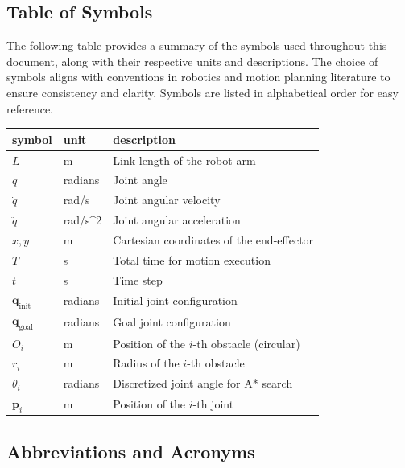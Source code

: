 \documentclass[12pt]{article}
\begin{document}
\subsection{Table of Symbols}

The following table provides a summary of the symbols used throughout this document, along with their respective units and descriptions. The choice of symbols aligns with conventions in robotics and motion planning literature to ensure consistency and clarity. Symbols are listed in alphabetical order for easy reference.

\renewcommand{\arraystretch}{1.2}
\noindent \begin{longtable*}{l l p{12cm}} \toprule
\textbf{symbol} & \textbf{unit} & \textbf{description}\\
\midrule 
\( L \) & \si{\metre} & Link length of the robot arm \\
\( q \) & radians & Joint angle \\
\( \dot{q} \) & rad/s & Joint angular velocity \\
\( \ddot{q} \) & rad/s^2 & Joint angular acceleration \\
\( x, y \) & \si{\metre} & Cartesian coordinates of the end-effector \\
\( T \) & \si{\second} & Total time for motion execution \\
\( t \) & \si{\second} & Time step \\
\( \mathbf{q}_{\text{init}} \) & radians & Initial joint configuration \\
\( \mathbf{q}_{\text{goal}} \) & radians & Goal joint configuration \\
\( O_i \) & \si{\metre} & Position of the \(i\)-th obstacle (circular) \\
\( r_i \) & \si{\metre} & Radius of the \(i\)-th obstacle \\
\( \theta_i \) & radians & Discretized joint angle for A* search \\
\( \mathbf{p}_i \) & \si{\metre} & Position of the \(i\)-th joint \\

\bottomrule
\end{longtable*}


\subsection{Abbreviations and Acronyms}
\end{document}
